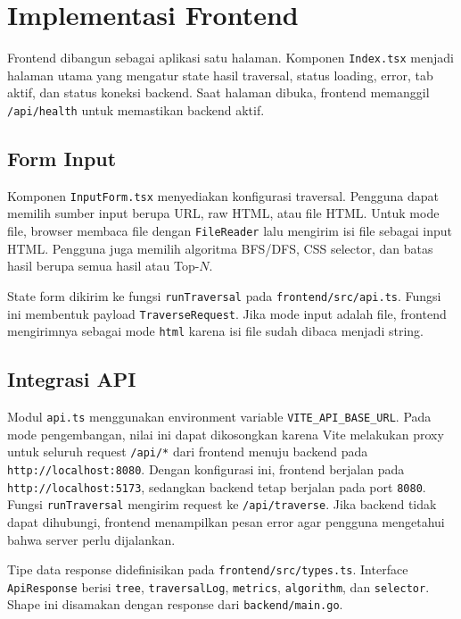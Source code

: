 \section{Implementasi Frontend}

Frontend dibangun sebagai aplikasi satu halaman. Komponen \texttt{Index.tsx} menjadi halaman utama yang mengatur state hasil traversal, status loading, error, tab aktif, dan status koneksi backend. Saat halaman dibuka, frontend memanggil \texttt{/api/health} untuk memastikan backend aktif.

\subsection{Form Input}

Komponen \texttt{InputForm.tsx} menyediakan konfigurasi traversal. Pengguna dapat memilih sumber input berupa URL, raw HTML, atau file HTML. Untuk mode file, browser membaca file dengan \texttt{FileReader} lalu mengirim isi file sebagai input HTML. Pengguna juga memilih algoritma BFS/DFS, CSS selector, dan batas hasil berupa semua hasil atau Top-$N$.

State form dikirim ke fungsi \texttt{runTraversal} pada \texttt{frontend/src/api.ts}. Fungsi ini membentuk payload \texttt{TraverseRequest}. Jika mode input adalah file, frontend mengirimnya sebagai mode \texttt{html} karena isi file sudah dibaca menjadi string.

\subsection{Integrasi API}

Modul \texttt{api.ts} menggunakan environment variable \texttt{VITE\_API\_BASE\_URL}. Pada mode pengembangan, nilai ini dapat dikosongkan karena Vite melakukan proxy untuk seluruh request \texttt{/api/*} dari frontend menuju backend pada \texttt{http://localhost:8080}. Dengan konfigurasi ini, frontend berjalan pada \texttt{http://localhost:5173}, sedangkan backend tetap berjalan pada port \texttt{8080}. Fungsi \texttt{runTraversal} mengirim request ke \texttt{/api/traverse}. Jika backend tidak dapat dihubungi, frontend menampilkan pesan error agar pengguna mengetahui bahwa server perlu dijalankan.

Tipe data response didefinisikan pada \texttt{frontend/src/types.ts}. Interface \texttt{ApiResponse} berisi \texttt{tree}, \texttt{traversalLog}, \texttt{metrics}, \texttt{algorithm}, dan \texttt{selector}. Shape ini disamakan dengan response dari \texttt{backend/main.go}.

